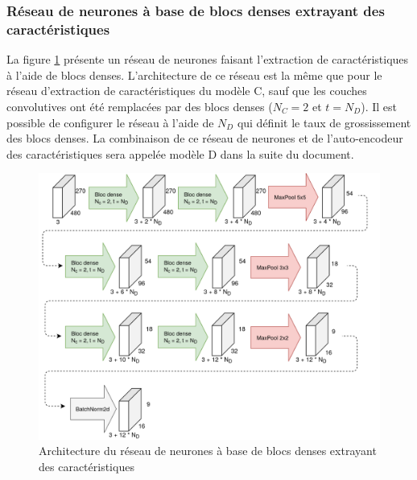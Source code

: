 \subsubsection{Réseau de neurones à base de blocs denses extrayant des caractéristiques}
    La figure \ref{fig:architecture_small_cnn_dense_bloc} présente un réseau de neurones faisant l'extraction de caractéristiques à l'aide de blocs denses. L'architecture de ce réseau est la même que pour le réseau d'extraction de caractéristiques du modèle C, sauf que les couches convolutives ont été remplacées par des blocs denses (\(N_C = 2\) et  \(t = N_D\)). Il est possible de configurer le réseau à l'aide de \(N_D\) qui définit le taux de grossissement des blocs denses. La combinaison de ce réseau de neurones et de l'auto-encodeur des caractéristiques sera appelée modèle D dans la suite du document.
    \begin{figure}
        \centering
        \includegraphics[width=17cm]{images/Architecture_SmallCnnWithAutoencoderDenseBlocks.png}
        \caption{Architecture du réseau de neurones à base de blocs denses extrayant des caractéristiques}
        \label{fig:architecture_small_cnn_dense_bloc}
    \end{figure}

